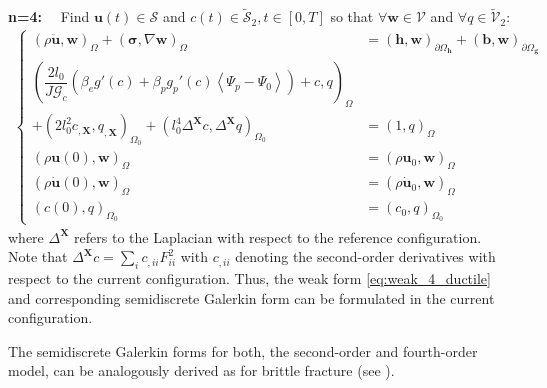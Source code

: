 \textbf{n=4:}$\quad$ Find $\mathbf{u}\left(t\right)\in\bm{\mathcal{S}}$ and $c\left(t\right)\in\tilde{\mathcal{S}}_{2},t\in\left[0,T\right]$ so that $\forall \mathbf{w}\in\bm{\mathcal{V}}$ and $\forall q\in\tilde{\mathcal{V}}_{2}$:
\begin{equation} \label{eq:weak_4_ductile}
\begin{aligned}
\left\{\begin{alignedat}{1}
	\left(\rho \ddot{\mathbf{u}},\mathbf{w}\right)_{\Omega} + \left(\bm{\sigma},\nabla\mathbf{w}\right)_{\Omega} &= \left(\mathbf{h},\mathbf{w}\right)_{\partial\Omega_{\mathbf{h}}} + \left(\mathbf{b},\mathbf{w}\right)_{\partial\Omega_{\mathbf{g}}} \\
	\left(\dfrac{2l_{0}}{J\mathcal{G}_{c}}\left(\beta_{e}g'\left(c\right)+\beta_{p}g_{p}'\left(c\right)\left<\Psi_{p}-\Psi_{0}\right>\right)+c,q\right)_{\Omega} & \\
	+\left(2l_{0}^{2} c_{,\mathbf{X}}, q_{,\mathbf{X}}\right)_{\Omega_{0}} + \left(l_{0}^{4}\Delta^{\mathbf{X}} c,\Delta^{\mathbf{X}} q\right)_{\Omega_{0}} &= \left(1,q\right)_{\Omega} \\
	\left(\rho\mathbf{u}\left(0\right),\mathbf{w}\right)_{\Omega} &= \left(\rho\mathbf{u}_{0},\mathbf{w}\right)_{\Omega} \\
	\left(\rho\dot{\mathbf{u}}\left(0\right),\mathbf{w}\right)_{\Omega} &= \left(\rho\dot{\mathbf{u}}_{0},\mathbf{w}\right)_{\Omega} \\
	\left(c\left(0\right),q\right)_{\Omega_{0}} &= \left(c_{0},q\right)_{\Omega_{0}}
\end{alignedat}\right.
\end{aligned}
\end{equation} 
where $\Delta^{\mathbf{X}}$ refers to the Laplacian with respect to the reference configuration. Note that $\Delta^{\mathbf{X}}c=\sum_{i}c_{,ii}F_{ii}^{2}$ with $c_{,ii}$ denoting the second-order derivatives with respect to the current configuration. Thus, the weak form \eqref{eq:weak_4_ductile} and corresponding semidiscrete Galerkin form can be formulated in the current configuration.

The semidiscrete Galerkin forms for both, the second-order and fourth-order model, can be analogously derived as for brittle fracture (see ).

